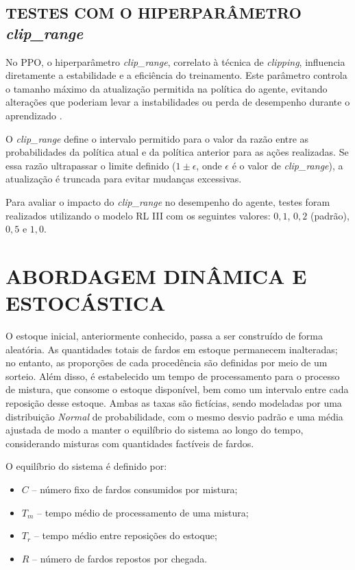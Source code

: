 \documentclass[
    12pt,                %
    openright,           %
    oneside,             %
    a4paper,             %
    english,             %
    spanish,             %
    brazil               %
]{ufscar}
\begin{document}
\subsection{TESTES COM O HIPERPARÂMETRO \textit{clip\_range}}

No PPO, o hiperparâmetro \textit{clip\_range}, correlato à técnica de \textit{clipping}, influencia diretamente a estabilidade e a eficiência do treinamento. Este parâmetro controla o tamanho máximo da atualização permitida na política do agente, evitando alterações que poderiam levar a instabilidades ou perda de desempenho durante o aprendizado \cite{schulman_proximal_2017}.

O \textit{clip\_range} define o intervalo permitido para o valor da razão entre as probabilidades da política atual e da política anterior para as ações realizadas. Se essa razão ultrapassar o limite definido (\(1 \pm \epsilon\), onde \(\epsilon\) é o valor de \textit{clip\_range}), a atualização é truncada para evitar mudanças excessivas.

Para avaliar o impacto do \textit{clip\_range} no desempenho do agente, testes foram realizados utilizando o modelo RL III com os seguintes valores: \(0,1\), \(0,2\) (padrão), \(0,5\) e \(1,0\). 

\section{ABORDAGEM DINÂMICA E ESTOCÁSTICA}

O estoque inicial, anteriormente conhecido, passa a ser construído de forma aleatória. As quantidades totais de fardos em estoque permanecem inalteradas; no entanto, as proporções de cada procedência são definidas por meio de um sorteio. Além disso, é estabelecido um tempo de processamento para o processo de mistura, que consome o estoque disponível, bem como um intervalo entre cada reposição desse estoque. Ambas as taxas são fictícias, sendo modeladas por uma distribuição \textit{Normal} de probabilidade, com o mesmo desvio padrão e uma média ajustada de modo a manter o equilíbrio do sistema ao longo do tempo, considerando misturas com quantidades factíveis de fardos.

O equilíbrio do sistema é definido por:

\begin{itemize}
    \item \( C \) – número fixo de fardos consumidos por mistura;
    \item \( T_m \) – tempo médio de processamento de uma mistura;
    \item \( T_r \) – tempo médio entre reposições do estoque;
    \item \( R \) – número de fardos repostos por chegada.
\end{itemize}
\end{document}
